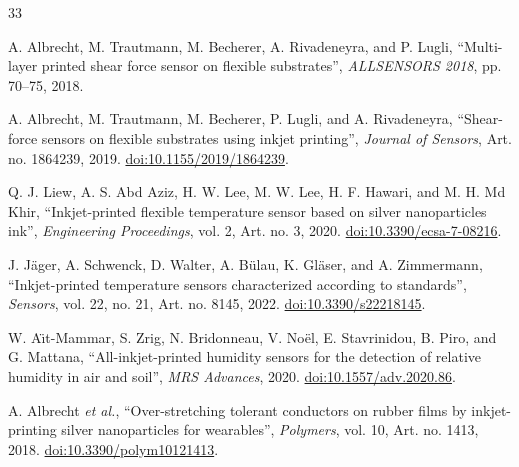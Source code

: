 \clearpage
{}

\begingroup
\fontsize{8.55}{9.75}\selectfont
\raggedright
\setlength{\parskip}{0.16em}
\makeatletter\let\section\@gobbletwo\makeatother
\begin{thebibliography}{33}

A. Albrecht, M. Trautmann, M. Becherer, A. Rivadeneyra, and P. Lugli,
\textquotedblleft Multi-layer printed shear force sensor on flexible
substrates\textquotedblright, \textit{ALLSENSORS 2018}, pp. 70--75, 2018.

A. Albrecht, M. Trautmann, M. Becherer, P. Lugli, and A. Rivadeneyra,
\textquotedblleft Shear-force sensors on flexible substrates using inkjet
printing\textquotedblright, \textit{Journal of Sensors}, Art. no. 1864239,
2019. \href{https://doi.org/10.1155/2019/1864239}{doi:10.1155/2019/1864239}.

Q. J. Liew, A. S. Abd Aziz, H. W. Lee, M. W. Lee, H. F. Hawari, and
M. H. Md Khir, \textquotedblleft Inkjet-printed flexible temperature sensor
based on silver nanoparticles ink\textquotedblright,
\textit{Engineering Proceedings}, vol. 2, Art. no. 3, 2020.
\href{https://doi.org/10.3390/ecsa-7-08216}{doi:10.3390/ecsa-7-08216}.

J. J\"ager, A. Schwenck, D. Walter, A. B\"ulau, K. Gl\"aser, and
A. Zimmermann, \textquotedblleft Inkjet-printed temperature sensors
characterized according to standards\textquotedblright,
\textit{Sensors}, vol. 22, no. 21, Art. no. 8145, 2022.
\href{https://doi.org/10.3390/s22218145}{doi:10.3390/s22218145}.

W. A\"{\i}t-Mammar, S. Zrig, N. Bridonneau, V. No\"el, E. Stavrinidou,
B. Piro, and G. Mattana, \textquotedblleft All-inkjet-printed humidity
sensors for the detection of relative humidity in air and soil\textquotedblright,
\textit{MRS Advances}, 2020.
\href{https://doi.org/10.1557/adv.2020.86}{doi:10.1557/adv.2020.86}.

A. Albrecht \textit{et al.}, \textquotedblleft Over-stretching tolerant
conductors on rubber films by inkjet-printing silver nanoparticles for
wearables\textquotedblright, \textit{Polymers}, vol. 10, Art. no. 1413, 2018.
\href{https://doi.org/10.3390/polym10121413}{doi:10.3390/polym10121413}.


\end{thebibliography}
